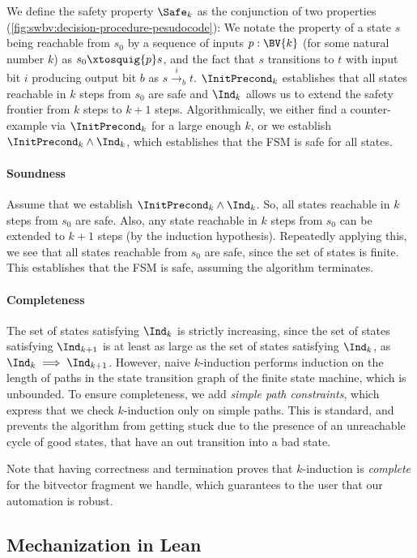 We define the safety property $\Safe_k$ as the conjunction of two properties (\cref{fig:swbv:decision-procedure-pesudocode}):
We notate the property of a state $s$ being reachable from $s_0$ by a sequence of inputs $p : \BV{k}$ (for some natural number $k$) as $s_0 \xtosquig{p} s$,
and the fact that $s$ transitions to $t$ with input bit $i$ producing output bit $b$ as $s \xrightarrow{i}_b t$.
$\InitPrecond_k$ establishes that all states reachable in $k$ steps from $s_0$ are safe
and $\Ind_k$ allows us to extend the safety frontier from $k$ steps to $k+1$ steps.
Algorithmically, we either find a counter-example via $\InitPrecond_k$ for a
large enough $k$, or we establish $\InitPrecond_k \land \Ind_k$, which establishes that the FSM is safe for all states.

\paragraph{Soundness}
Assume that we establish $\InitPrecond_k \land \Ind_k$.
So, all states reachable in $k$ steps from $s_0$ are safe.
Also, any state reachable in $k$ steps from $s_0$ can be extended to $k+1$ steps (by the induction hypothesis).
Repeatedly applying this, we see that all states reachable from $s_0$ are safe, since the set of states is finite.
This establishes that the FSM is safe, assuming the algorithm terminates.

\paragraph{Completeness}
The set of states satisfying $\Ind_k$ is strictly increasing, since the set of states satisfying $\Ind_{k+1}$ is at least as large as the set of states satisfying $\Ind_{k}$,
as $\Ind_{k} \implies \Ind_{k+1}$.
However, naive $k$-induction performs induction on the length of paths in the state transition graph of the finite state machine, which is unbounded.
To ensure completeness, we add \emph{simple path constraints},
which express that we check $k$-induction only on simple paths.
This is standard, and prevents the algorithm from getting stuck due to the presence of an unreachable
cycle of good states, that have an out transition into a bad state.

Note that having correctness and termination proves that $k$-induction is \emph{complete} for the bitvector fragment we handle, which guarantees to the user that our automation is robust.

\subsection{Mechanization in Lean}

